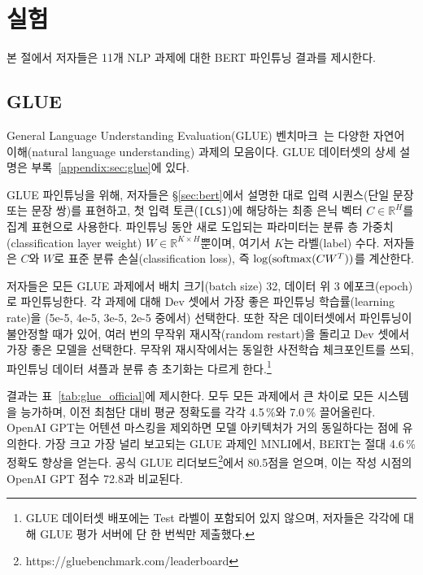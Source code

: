 
\section{실험}
\label{sec:experiments}

본 절에서 저자들은 11개 NLP 과제에 대한 BERT 파인튜닝 결과를 제시한다.

\subsection{GLUE}
\label{sec:glue}

General Language Understanding Evaluation(GLUE) 벤치마크~\cite{wang-etal:2018:_glue}는 다양한 자연어 이해(natural language understanding) 과제의 모음이다.
GLUE 데이터셋의 상세 설명은 부록~\ref{appendix:sec:glue}에 있다.

GLUE 파인튜닝을 위해, 저자들은 \S\ref{sec:bert}에서 설명한 대로 입력 시퀀스(단일 문장 또는 문장 쌍)를 표현하고, 첫 입력 토큰({\tt [CLS]})에 해당하는 최종 은닉 벡터 $C \in \mathbb{R}^{H}$를 집계 표현으로 사용한다.
파인튜닝 동안 새로 도입되는 파라미터는 분류 층 가중치(classification layer weight) $W \in \mathbb{R}^{K \times H}$뿐이며, 여기서 $K$는 라벨(label) 수다. 저자들은 $C$와 $W$로 표준 분류 손실(classification loss), 즉 $\log({\rm softmax}(CW^T))$를 계산한다.

저자들은 모든 GLUE 과제에서 배치 크기(batch size) 32, 데이터 위 3 에포크(epoch)로 파인튜닝한다. 각 과제에 대해 Dev 셋에서 가장 좋은 파인튜닝 학습률(learning rate)을 (5e-5, 4e-5, 3e-5, 2e-5 중에서) 선택한다. 또한  작은 데이터셋에서 파인튜닝이 불안정할 때가 있어, 여러 번의 무작위 재시작(random restart)을 돌리고 Dev 셋에서 가장 좋은 모델을 선택한다. 무작위 재시작에서는 동일한 사전학습 체크포인트를 쓰되, 파인튜닝 데이터 셔플과 분류 층 초기화는 다르게 한다.\footnote{GLUE 데이터셋 배포에는 Test 라벨이 포함되어 있지 않으며, 저자들은  \bertlarge 각각에 대해 GLUE 평가 서버에 단 한 번씩만 제출했다.}

결과는 표~\ref{tab:glue_official}에 제시한다.  \bertlarge 모두 모든 과제에서 큰 차이로 모든 시스템을 능가하며, 이전 최첨단 대비 평균 정확도를 각각 4.5\,\%와 7.0\,\% 끌어올린다.  OpenAI GPT는 어텐션 마스킹을 제외하면 모델 아키텍처가 거의 동일하다는 점에 유의한다. 가장 크고 가장 널리 보고되는 GLUE 과제인 MNLI에서, BERT는 절대 4.6\,\% 정확도 향상을 얻는다. 공식 GLUE 리더보드\footnote{https://gluebenchmark.com/leaderboard}에서  80.5점을 얻으며, 이는 작성 시점의 OpenAI GPT 점수 72.8과 비교된다.

